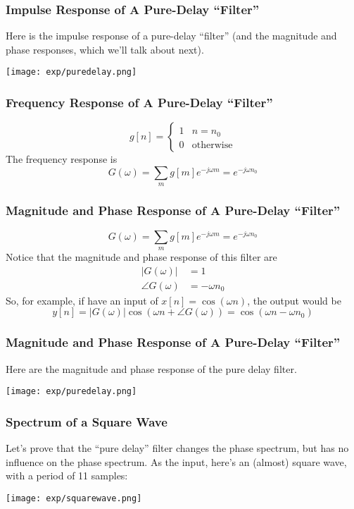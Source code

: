 \documentclass{beamer}
\begin{document}
\begin{frame}
  \frametitle{Impulse Response of A Pure-Delay ``Filter''}
  Here is the impulse response of a pure-delay ``filter'' (and the magnitude and
  phase responses, which we'll talk about next).
\centerline{\texttt{[image: exp/puredelay.png]}}
\end{frame}

\begin{frame}
  \frametitle{Frequency Response of A Pure-Delay ``Filter''}

  \[
  g[n]=\begin{cases}
  1 & n=n_0\\
  0 & \mbox{otherwise}
  \end{cases}
  \]
  The frequency response is
  \[
  G(\omega)=\sum_m g[m]e^{-j\omega m} = e^{-j\omega n_0}
  \]
  
\end{frame}

\begin{frame}
  \frametitle{Magnitude and Phase Response of A Pure-Delay ``Filter''}

  \[
  G(\omega)=\sum_m g[m]e^{-j\omega m} = e^{-j\omega n_0}
  \]
  Notice that the magnitude and phase response of this filter are
  \begin{align*}
    |G(\omega)| &= 1\\
    \angle G(\omega) &= -\omega n_0
  \end{align*}
  So, for example, if have an input of $x[n]=\cos(\omega n)$, the
  output would be
  \[
  y[n]=|G(\omega)|\cos\left(\omega n+\angle G(\omega)\right)
  = \cos\left(\omega n-\omega n_0\right)
  \]
\end{frame}

\begin{frame}
  \frametitle{Magnitude and Phase Response of A Pure-Delay ``Filter''}
  Here are the magnitude and phase response of the pure delay filter.
\centerline{\texttt{[image: exp/puredelay.png]}}
\end{frame}

\begin{frame}
  \frametitle{Spectrum of a Square Wave}

  Let's prove that the ``pure delay'' filter changes the phase
  spectrum, but has no influence on the phase spectrum.  As the input,
  here's an (almost) square wave,
  with a period of 11 samples:
  \centerline{\texttt{[image: exp/squarewave.png]}}
\end{frame}
\end{document}
